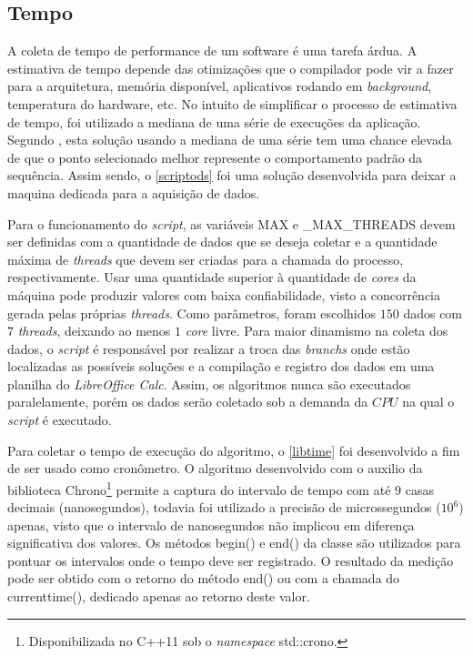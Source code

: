 \subsection*{Tempo} %
\label{sec:tempo}

A coleta de tempo de performance de um software é uma tarefa árdua. A estimativa de tempo depende das otimizações que o compilador pode vir a fazer para a arquitetura, memória disponível, aplicativos rodando em \textit{background}, temperatura do hardware, etc. No intuito de simplificar o processo de estimativa de tempo, foi utilizado a mediana de uma série de execuções da aplicação. Segundo , esta solução usando a mediana de uma série tem uma chance elevada de que o ponto selecionado melhor represente o comportamento padrão da sequência. Assim sendo, o \autoref{scriptods} foi uma solução desenvolvida para deixar a maquina dedicada para a aquisição de dados.

Para o funcionamento do \textit{script}, as variáveis {\code MAX} e {\code \_MAX\_THREADS} devem ser definidas com a quantidade de dados que se deseja coletar e a quantidade máxima de \textit{threads} que devem ser criadas para a chamada do processo, respectivamente. Usar uma quantidade superior à quantidade de \textit{cores}  da máquina pode produzir valores com baixa confiabilidade, visto a concorrência gerada pelas próprias \textit{threads}. Como parâmetros, foram escolhidos $150$ dados com $7$ \textit{threads}, deixando ao menos $1$ \textit{core} livre. Para maior dinamismo na coleta dos dados, o \textit{script} é responsável por realizar a troca das \textit{branchs} onde estão localizadas as possíveis soluções e a compilação e registro dos dados em uma planilha do \textit{LibreOffice Calc}. Assim, os algoritmos nunca são executados paralelamente, porém os dados serão coletado sob a demanda da $CPU$ na qual o \textit{script} é executado.

Para coletar o tempo de execução do algoritmo, o \autoref{libtime} foi desenvolvido a fim de ser usado como cronômetro. O algoritmo desenvolvido com o auxilio da biblioteca {\code Chrono}\footnote{Disponibilizada no {\code C++11} sob o \textit{namespace} {\code std::crono}.} permite a captura do intervalo de tempo com até $9$ casas decimais (nanosegundos), todavia foi utilizado a precisão de microssegundos ($10^ 6$) apenas, visto que o intervalo de nanosegundos não implicou em diferença significativa dos valores. Os métodos {\code begin()} e {\code end()} da classe são utilizados para pontuar os intervalos onde o tempo deve ser registrado. O resultado da medição pode ser obtido com o retorno do método {\code end()} ou com a chamada do {\code currenttime()}, dedicado apenas ao retorno deste valor.

